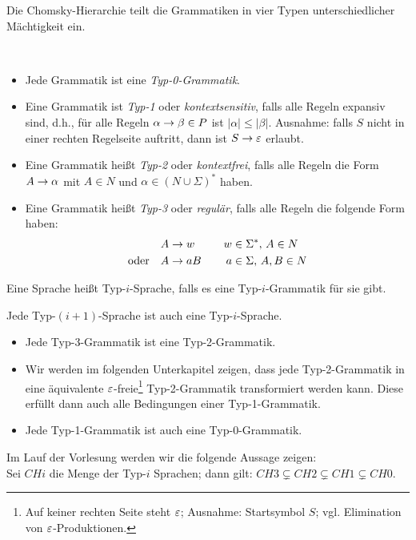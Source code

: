 \bigskip

Die Chomsky-Hierarchie teilt die Grammatiken in vier Typen unterschiedlicher Mächtigkeit ein.
\begin{Def}\
	\begin{itemize}
	\item Jede Grammatik ist eine \emph{Typ-0-Grammatik}.
	\item Eine Grammatik ist \emph{Typ-1} oder
          \emph{kontextsensitiv}, falls alle Regeln expansiv sind,
          d.h., für alle Regeln $\alpha\->\beta\in P$ ist
          $|\alpha|\leq |\beta|$. Ausnahme: falls $S$ nicht in einer
          rechten Regelseite auftritt, dann ist $S\->\Eps$ erlaubt. 
	\item Eine Grammatik heißt \emph{Typ-2} oder \emph{kontextfrei}, falls alle Regeln die Form $A\->\alpha$ mit $A\in N$ und $\alpha\in(N\cup\Sigma)^*$ haben.
	\item Eine Grammatik heißt \emph{Typ-3} oder \emph{regulär}, falls alle Regeln die folgende Form haben:
	\begin{alignat*}{2}
		&A\->w &\quad w&\in\Sigma^*,\, A \in N\\
		\text{oder}\quad &A\->aB& a&\in\Sigma,\, A,B\in N
	\end{alignat*}
	\end{itemize}
	Eine Sprache heißt Typ-$i$-Sprache, falls es eine Typ-$i$-Grammatik für sie gibt.
\end{Def}

\begin{Beobachtung}\label{beob:3.ChomskyHierarchie}
	Jede Typ-$(i+1)$-Sprache ist auch eine Typ-$i$-Sprache.
\end{Beobachtung}
\begin{itemize}
 \item Jede Typ-3-Grammatik ist eine Typ-2-Grammatik.
 \item Wir werden im folgenden Unterkapitel zeigen, dass jede Typ-2-Grammatik in eine äquivalente $\varepsilon$-freie\footnote{Auf keiner rechten Seite steht $\varepsilon$; Ausnahme: Startsymbol $S$; vgl. Elimination von $\varepsilon$-Produktionen.} Typ-2-Grammatik transformiert werden kann.
 Diese erfüllt dann auch alle Bedingungen einer Typ-1-Grammatik.
 \item Jede Typ-1-Grammatik ist auch eine Typ-0-Grammatik.
\end{itemize}

Im Lauf der Vorlesung werden wir die folgende Aussage zeigen:\\
Sei $CHi$ die Menge der Typ-$i$ Sprachen; dann gilt: 
$CH3 \subsetneq CH2 \subsetneq CH1 \subsetneq CH0$.




